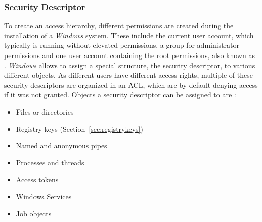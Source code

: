 \subsubsection{Security Descriptor}
\label{sec:sd}
To create an access hierarchy, different permissions are created during the installation of a \emph{Windows} system. These include the current user account, which typically is running without elevated permissions, a group for administrator permissions and one user account containing the root permissions, also known as  \cite{msdn_localsystem1, msdn_localsystem2}. \emph{Windows} allows to assign a special structure, the security descriptor, to various different objects. As different users have different access rights, multiple of these security descriptors are organized in an \gls{ACL}, which are by default denying access if it was not granted. Objects a security descriptor can be assigned to are \cite{msdn_sd}:
\begin{itemize}
\item Files or directories
\item Registry keys (Section~\ref{sec:registrykeys})
\item Named and anonymous pipes
\item Processes and threads
\item Access tokens
\item Windows Services
\item Job objects
\end{itemize}
